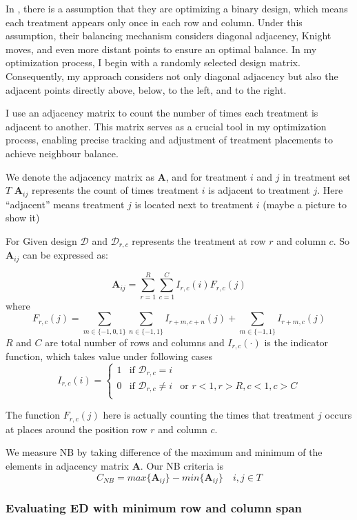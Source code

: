 \documentclass[
  a4paper,
  oneside,
  openany,
  12pt,
  onecolumn]{book}
\theoremstyle{plain}
\theoremstyle{definition}
\theoremstyle{remark}
\begin{document}
In \citet{piepho2018neighbor}, there is a assumption that they are
optimizing a binary design, which means each treatment appears only once
in each row and column. Under this assumption, their balancing mechanism
considers diagonal adjacency, Knight moves, and even more distant points
to ensure an optimal balance. In my optimization process, I begin with a
randomly selected design matrix. Consequently, my approach considers not
only diagonal adjacency but also the adjacent points directly above,
below, to the left, and to the right.

I use an adjacency matrix to count the number of times each treatment is
adjacent to another. This matrix serves as a crucial tool in my
optimization process, enabling precise tracking and adjustment of
treatment placements to achieve neighbour balance.

We denote the adjacency matrix as \(\boldsymbol{A}\), and for treatment
\(i\) and \(j\) in treatment set \(T\) \(\boldsymbol{A}_{ij}\)
represents the count of times treatment \(i\) is adjacent to treatment
\(j\). Here ``adjacent'' means treatment \(j\) is located next to
treatment \(i\) (maybe a picture to show it)

For Given design \(\mathcal{D}\) and \(\mathcal{D}_{r,c}\) represents
the treatment at row \(r\) and column \(c\). So \(\boldsymbol{A}_{ij}\)
can be expressed as:

\[
\boldsymbol{A}_{ij}=\sum_{r=1}^{R}\sum_{c=1}^{C}I_{r,c}(i) F_{r,c}(j)
\] where \[
F_{r,c}(j)=
\sum_{m \in \{-1,0,1\}}\sum_{n \in \{-1,1\}}I_{r+m,c+n}(j)+\sum_{m \in \{-1,1\}}I_{r+m,c}(j)
\] \(R\) and \(C\) are total number of rows and columns and
\(I_{r,c}(\cdot)\) is the indicator function, which takes value under
following cases \[
I_{r,c}(i)=
\begin{cases}
1 & \text{if } \mathcal{D}_{r,c}=i \\
0 & \text{if } \mathcal{D}_{r,c}\neq i & \text{or } r<1,r>R,c<1,c>C\\
\end{cases}
\]

The function \(F_{r,c}(j)\) here is actually counting the times that
treatment \(j\) occurs at places around the position row \(r\) and
column \(c\).

We measure NB by taking difference of the maximum and minimum of the
elements in adjacency matrix \(\boldsymbol{A}\). Our NB criteria is \[
C_{NB}=max\{\boldsymbol{A}_{ij}\}-min\{\boldsymbol{A}_{ij}\}  \quad i,j\in T
\]

\subsubsection{Evaluating ED with minimum row and column
span}\label{evaluating-ed-with-minimum-row-and-column-span}
\end{document}
